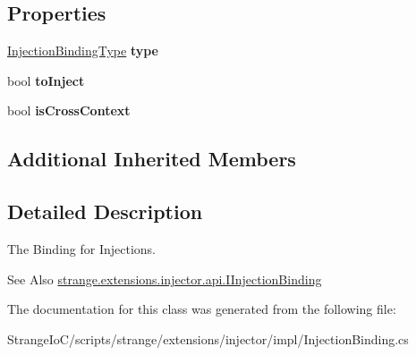 \subsection*{Properties}
\begin{DoxyCompactItemize}
\item 
\hypertarget{classstrange_1_1extensions_1_1injector_1_1impl_1_1_injection_binding_a915f5c97eceb69c2d893e8874cc255d1}{\hyperlink{namespacestrange_1_1extensions_1_1injector_1_1api_aaf5414484d7eccb5c502984bd70549ae}{Injection\-Binding\-Type} {\bfseries type}}\label{classstrange_1_1extensions_1_1injector_1_1impl_1_1_injection_binding_a915f5c97eceb69c2d893e8874cc255d1}

\item 
\hypertarget{classstrange_1_1extensions_1_1injector_1_1impl_1_1_injection_binding_aeb55d17167b209c72042d67dee584070}{bool {\bfseries to\-Inject}}\label{classstrange_1_1extensions_1_1injector_1_1impl_1_1_injection_binding_aeb55d17167b209c72042d67dee584070}

\item 
\hypertarget{classstrange_1_1extensions_1_1injector_1_1impl_1_1_injection_binding_ae1cd10550dbe5a828d1db86c40fb098d}{bool {\bfseries is\-Cross\-Context}}\label{classstrange_1_1extensions_1_1injector_1_1impl_1_1_injection_binding_ae1cd10550dbe5a828d1db86c40fb098d}

\end{DoxyCompactItemize}
\subsection*{Additional Inherited Members}


\subsection{Detailed Description}
The Binding for Injections. 

\begin{DoxySeeAlso}{See Also}
\hyperlink{interfacestrange_1_1extensions_1_1injector_1_1api_1_1_i_injection_binding}{strange.\-extensions.\-injector.\-api.\-I\-Injection\-Binding} 
\end{DoxySeeAlso}


The documentation for this class was generated from the following file\-:\begin{DoxyCompactItemize}
\item 
Strange\-Io\-C/scripts/strange/extensions/injector/impl/Injection\-Binding.\-cs\end{DoxyCompactItemize}
